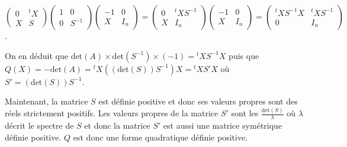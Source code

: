 {{\begin{center}
$\left(
\begin{array}{cc}
0&{^t}X\\
X&S
\end{array}\right)\left(
\begin{array}{cc}
1&0\\
0&S^{-1}
\end{array}\right)\left(
\begin{array}{cc}
-1&0\\
X&I_n
\end{array}\right)=\left(
\begin{array}{cc}
0&{^t}XS^{-1}\\
X&I_n
\end{array}\right)\left(
\begin{array}{cc}
-1&0\\
X&I_n
\end{array}\right)=\left(
\begin{array}{cc}
{^t}XS^{-1}X&{^t}XS^{-1}\\
0&I_n
\end{array}\right)$.
\end{center}

On en déduit que $\text{det}(A)\times\text{det}(S^{-1})\times(-1)={^t}XS^{-1}X$ puis que $Q(X)=-\text{det}(A)={^t}X((\text{det}(S))S^{-1})X ={^t}XS'X$ où $S'=(\text{det}(S))S^{-1}$.

Maintenant, la matrice $S$ est définie positive et donc ses valeurs propres sont des réels strictement positifs. Les valeurs propres de la matrice $S'$ sont les $\frac{\text{det}(S)}{\lambda}$ où $\lambda$ décrit le spectre de $S$ et donc la matrice $S'$ est aussi une matrice symétrique définie positive. $Q$ est donc une forme quadratique définie positive.}
}